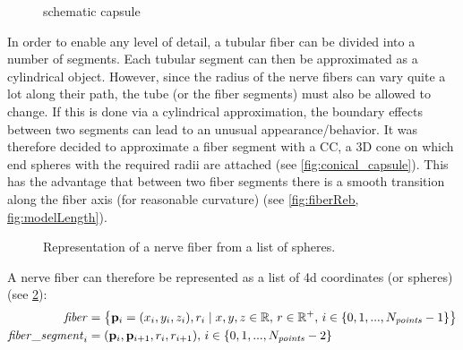% 
\begin{figure}[!t]
    \centering
    \setlength{\tikzwidth}{0.5\textwidth}
	\caption{schematic capsule}
	\label{fig:conical}
\end{figure}
% 
In order to enable any level of detail, a tubular fiber can be divided into a number of segments.
Each tubular segment can then be approximated as a cylindrical object.
However, since the radius of the nerve fibers can vary quite a lot along their path, the tube (or the fiber segments) must also be allowed to change.
If this is done via a cylindrical approximation, the boundary effects between two segments can lead to an unusual appearance/behavior.
It was therefore decided to approximate a fiber segment with a \ac{CC}, a 3D cone on which end spheres with the required radii are attached (see \cref{fig:conical_capsule}).
This has the advantage that between two fiber segments there is a smooth transition along the fiber axis (for reasonable curvature) (see \cref{fig:fiberReb, fig:modelLength}).
% 
\begin{figure}[!t]
    \setlength{\tikzwidth}{0.85\textwidth}
    \centering
	\caption[]{Representation of a nerve fiber from a list of spheres.}
	\label{fig:fiberReb}
\end{figure}
% 
A nerve fiber can therefore be represented as a list of 4d coordinates (or spheres) (see \cref{fig:fiberReb}):
\begin{align}
\begin{split}
\mathit{fiber} &= \left\{ \mathbf{p}_i=(x_i,y_i,z_i), r_i \mid x,y,z \in \mathbb{R}, \, r \in \mathbb{R^+}, \, i \in \{0,1,...,N_{\mathit{points}}-1\}\right\} \\
\mathit{fiber\_segment}_i &= (\mathbf{p}_i, \mathbf{p}_{i+1}, r_i, r_{i+1}), \, i \in \{0,1,...,N_{\mathit{points}}-2\}
\end{split}
\end{align}
% 
